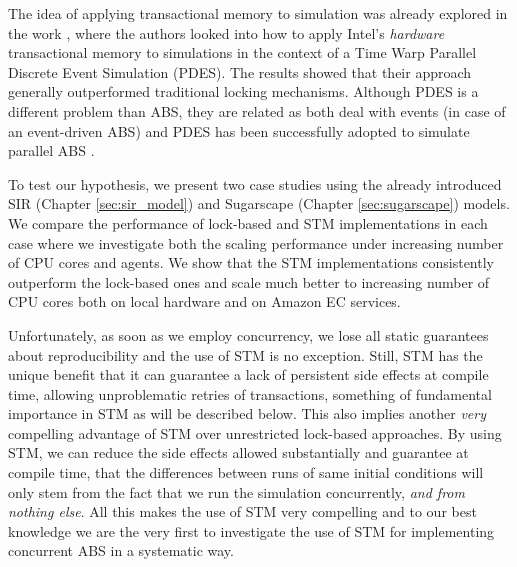 The idea of applying transactional memory to simulation was already explored in the work \cite{hay_experiments_2015}, where the authors looked into how to apply Intel’s \textit{hardware} transactional memory to simulations in the context of a Time Warp Parallel Discrete Event Simulation (PDES). The results showed that their approach generally outperformed traditional locking mechanisms. Although PDES is a different problem than ABS, they are related as both deal with events (in case of an event-driven ABS) and PDES has been successfully adopted to simulate parallel ABS \cite{suryanarayanan_pdes-mas_2013}.

To test our hypothesis, we present two case studies using the already introduced SIR (Chapter \ref{sec:sir_model}) and Sugarscape (Chapter \ref{sec:sugarscape}) models. We compare the performance of lock-based and STM implementations in each case where we investigate both the scaling performance under increasing number of CPU cores and agents. We show that the STM implementations consistently outperform the lock-based ones and scale much better to increasing number of CPU cores both on local hardware and on Amazon EC services.

Unfortunately, as soon as we employ concurrency, we lose all static guarantees about reproducibility and the use of STM is no exception. Still, STM has the unique benefit that it can guarantee a lack of persistent side effects at compile time, allowing unproblematic retries of transactions, something of fundamental importance in STM as will be described below. This also implies another \textit{very} compelling advantage of STM over unrestricted lock-based approaches. By using STM, we can reduce the side effects allowed substantially and guarantee at compile time, that the differences between runs of same initial conditions will only stem from the fact that we run the simulation concurrently, \textit{and from nothing else}. All this makes the use of STM very compelling and to our best knowledge we are the very first to investigate the use of STM for implementing concurrent ABS in a systematic way.









